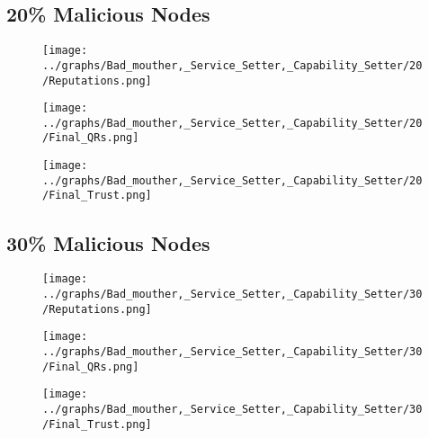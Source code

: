 \documentclass{article}
\begin{document}
  \begin{minipage}[t]{0.49\columnwidth}
    \subsection*{20\% Malicious Nodes}
        \begin{figure}[H]
            \centering
            \texttt{[image: ../graphs/Bad\_mouther,\_Service\_Setter,\_Capability\_Setter/20/Reputations.png]}
        \end{figure}
        \begin{figure}[H]
            \centering
            \texttt{[image: ../graphs/Bad\_mouther,\_Service\_Setter,\_Capability\_Setter/20/Final\_QRs.png]}
        \end{figure}
    \end{minipage}
    \begin{minipage}[t]{0.49\columnwidth}
        \begin{figure}[H]
            \centering
            \texttt{[image: ../graphs/Bad\_mouther,\_Service\_Setter,\_Capability\_Setter/20/Final\_Trust.png]}
        \end{figure}
    \end{minipage}

  \begin{minipage}[t]{0.49\columnwidth}
    \subsection*{30\% Malicious Nodes}
        \begin{figure}[H]
            \centering
            \texttt{[image: ../graphs/Bad\_mouther,\_Service\_Setter,\_Capability\_Setter/30/Reputations.png]}
        \end{figure}
        \begin{figure}[H]
            \centering
            \texttt{[image: ../graphs/Bad\_mouther,\_Service\_Setter,\_Capability\_Setter/30/Final\_QRs.png]}
        \end{figure}
    \end{minipage}
    \begin{minipage}[t]{0.49\columnwidth}
        \begin{figure}[H]
            \centering
            \texttt{[image: ../graphs/Bad\_mouther,\_Service\_Setter,\_Capability\_Setter/30/Final\_Trust.png]}
        \end{figure}
    \end{minipage}
\end{document}
